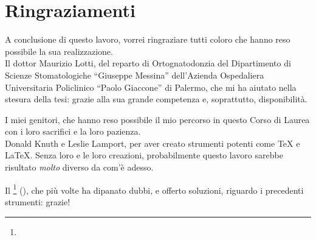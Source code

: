 \chapter{Ringraziamenti}
A conclusione di questo lavoro, vorrei ringraziare tutti coloro che hanno reso possibile la sua realizzazione.\\

Il dottor Maurizio Lotti, del reparto di Ortognatodonzia del Dipartimento di Scienze Stomatologiche ``Giuseppe Messina'' dell'Azienda Ospedaliera Universitaria Policlinico ``Paolo Giaccone'' di Palermo, che mi ha aiutato nella stesura della tesi: grazie alla sua grande competenza e, soprattutto, disponibilità.

I miei genitori, che hanno reso possibile il mio percorso in questo Corso di Laurea con i loro sacrifici e la loro pazienza.\\

Donald Knuth e Leslie Lamport, per aver creato strumenti potenti come \TeX{} e \LaTeX{}. Senza loro e le loro creazioni, probabilmente questo lavoro sarebbe risultato \emph{molto} diverso da com'è adesso.

Il \GuIT{}\footnote{\GuITurl} (\GuITtext), che più volte ha dipanato dubbi, e offerto soluzioni, riguardo i precedenti strumenti: grazie!